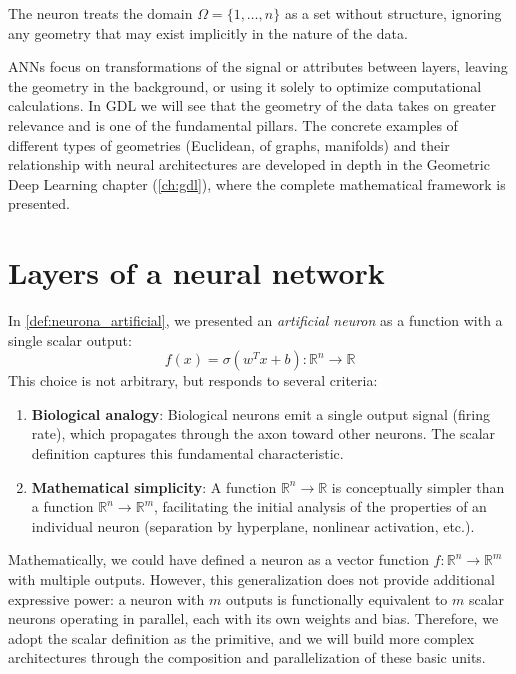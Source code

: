 The neuron treats the domain $\Omega = \{1,\ldots,n\}$ as a set without structure, ignoring any geometry that may exist implicitly in the nature of the data.

\glspl{ANN} focus on transformations of the signal or attributes between layers, leaving the geometry in the background, or using it solely to optimize computational calculations. In \gls{GDL} we will see that the geometry of the data takes on greater relevance and is one of the fundamental pillars. The concrete examples of different types of geometries (Euclidean, of graphs, manifolds) and their relationship with neural architectures are developed in depth in the Geometric Deep Learning chapter (\autoref{ch:gdl}), where the complete mathematical framework is presented.

\section{Layers of a neural network}

In \autoref{def:neurona_artificial}, we presented an \textit{artificial neuron} as a function with a single scalar output:
\[
f(x) = \sigma(w^T x + b): \mathbb{R}^n \to \mathbb{R}
\]
This choice is not arbitrary, but responds to several criteria:

\begin{enumerate}
    \item \textbf{Biological analogy}: Biological neurons emit a single output signal (firing rate), which propagates through the axon toward other neurons. The scalar definition captures this fundamental characteristic.

    \item \textbf{Mathematical simplicity}: A function $\mathbb{R}^n \to \mathbb{R}$ is conceptually simpler than a function $\mathbb{R}^n \to \mathbb{R}^m$, facilitating the initial analysis of the properties of an individual neuron (separation by hyperplane, nonlinear activation, etc.).
\end{enumerate}

Mathematically, we could have defined a neuron as a vector function $f: \mathbb{R}^n \to \mathbb{R}^m$ with multiple outputs. However, this generalization does not provide additional expressive power: a neuron with $m$ outputs is functionally equivalent to $m$ scalar neurons operating in parallel, each with its own weights and bias. Therefore, we adopt the scalar definition as the primitive, and we will build more complex architectures through the composition and parallelization of these basic units.

